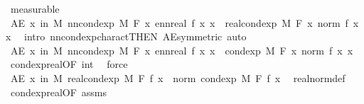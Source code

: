 \begin{isabellebody}
\ measurable\isanewline
\ \ \isamarkupfalse%
\ \isamarkupfalse%
\ {\isachardoublequoteopen}AE\ x\ in\ M{\isachardot}{\kern0pt}\ nn{\isacharunderscore}{\kern0pt}cond{\isacharunderscore}{\kern0pt}exp\ M\ F\ {\isacharparenleft}{\kern0pt}{\isasymlambda}x{\isachardot}{\kern0pt}\ ennreal\ {\isasymbar}f\ x{\isasymbar}{\isacharparenright}{\kern0pt}\ x\ {\isacharequal}{\kern0pt}\ real{\isacharunderscore}{\kern0pt}cond{\isacharunderscore}{\kern0pt}exp\ M\ F\ {\isacharparenleft}{\kern0pt}{\isasymlambda}x{\isachardot}{\kern0pt}\ norm\ {\isacharparenleft}{\kern0pt}f\ x{\isacharparenright}{\kern0pt}{\isacharparenright}{\kern0pt}\ x{\isachardoublequoteclose}\ \isamarkupfalse%
\ {\isacharparenleft}{\kern0pt}intro\ nn{\isacharunderscore}{\kern0pt}cond{\isacharunderscore}{\kern0pt}exp{\isacharunderscore}{\kern0pt}charact{\isacharbrackleft}{\kern0pt}THEN\ AE{\isacharunderscore}{\kern0pt}symmetric{\isacharbrackright}{\kern0pt}{\isacharcomma}{\kern0pt}\ auto{\isacharparenright}{\kern0pt}\isanewline
\ \ \ \ \isamarkupfalse%
\ {\isachardoublequoteopen}AE\ x\ in\ M{\isachardot}{\kern0pt}\ nn{\isacharunderscore}{\kern0pt}cond{\isacharunderscore}{\kern0pt}exp\ M\ F\ {\isacharparenleft}{\kern0pt}{\isasymlambda}x{\isachardot}{\kern0pt}\ ennreal\ {\isasymbar}f\ x{\isasymbar}{\isacharparenright}{\kern0pt}\ x\ {\isasymle}\ cond{\isacharunderscore}{\kern0pt}exp\ M\ F\ {\isacharparenleft}{\kern0pt}{\isasymlambda}x{\isachardot}{\kern0pt}\ norm\ {\isacharparenleft}{\kern0pt}f\ x{\isacharparenright}{\kern0pt}{\isacharparenright}{\kern0pt}\ x{\isachardoublequoteclose}\ \isamarkupfalse%
\ cond{\isacharunderscore}{\kern0pt}exp{\isacharunderscore}{\kern0pt}real{\isacharbrackleft}{\kern0pt}OF\ int{\isacharbrackright}{\kern0pt}\ \isamarkupfalse%
\ force\isanewline
\ \ \isamarkupfalse%
\ \isamarkupfalse%
\ {\isachardoublequoteopen}AE\ x\ in\ M{\isachardot}{\kern0pt}\ {\isasymbar}real{\isacharunderscore}{\kern0pt}cond{\isacharunderscore}{\kern0pt}exp\ M\ F\ f\ x{\isasymbar}\ {\isacharequal}{\kern0pt}\ norm\ {\isacharparenleft}{\kern0pt}cond{\isacharunderscore}{\kern0pt}exp\ M\ F\ f\ x{\isacharparenright}{\kern0pt}{\isachardoublequoteclose}\ \isamarkupfalse%
\ real{\isacharunderscore}{\kern0pt}norm{\isacharunderscore}{\kern0pt}def\ \isamarkupfalse%
\ cond{\isacharunderscore}{\kern0pt}exp{\isacharunderscore}{\kern0pt}real{\isacharbrackleft}{\kern0pt}OF\ assms{\isacharbrackright}{\kern0pt}\ {\isacharasterisk}{\kern0pt}\ \isamarkupfalse%

\end{isabellebody}
